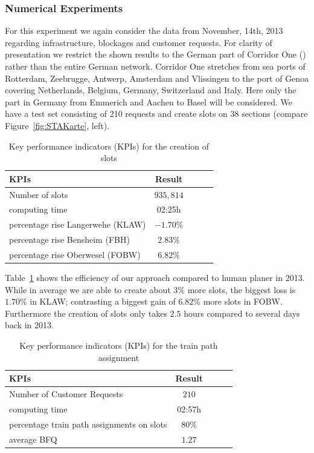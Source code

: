 \subsubsection{Numerical Experiments}
For this experiment we again consider the data from November, 14th, 2013 regarding infrastructure, blockages and customer requests. For clarity of presentation we restrict the shown results to the German part of Corridor One (\cite{Kor1}) rather than the entire German network. Corridor One stretches from sea ports of Rotterdam, Zeebrugge, Antwerp, Amsterdam and Vlissingen to the port of Genoa covering Netherlands, Belgium, Germany, Switzerland and Italy. Here only the part in Germany from Emmerich and Aachen to Basel will be considered. We have a test set consisting of 210 requests and create slots on 38 sections (compare Figure~\ref{fig:STAKarte}, left).
%
\begin{table}[h]
	\centering
	\caption{Key performance indicators (KPIs) for the creation of slots}
	\label{tab:result_Netzfpl}
	\begin{tabular}{lcccc} \hline
		\textbf{KPIs}   					& \textbf{Result}  \\ \hline
		Number of slots             		& $935,814$                      \\
		computing time       				& 02:25h                     \\
		percentage rise Langerwehe (KLAW)   & $-1.70\%$                       \\
		percentage rise Bensheim (FBH) 		& $2.83\%$                       \\
		percentage rise Oberwesel (FOBW) 	& $6.82\%$                     \\ \hline
	\end{tabular}
\end{table}
\par

Table~\ref{tab:result_Netzfpl} shows the efficiency of our approach compared to human planer in 2013. While in average we are able to create about $3\%$ more slots, the biggest loss is $1.70\%$ in KLAW; contrasting a biggest gain of $6.82\%$ more slots in FOBW. Furthermore the creation of slots only takes $2.5$ hours compared to several days back in 2013.
%
\begin{table}[h]
	\centering
	\caption{Key performance indicators (KPIs) for the train path assignment}
	\label{tab:result_Netzfpl_Bel}
	\begin{tabular}{lcccc} \hline
		\textbf{KPIs}   							& \textbf{Result}  \\ \hline
		Number of Customer Requests     			& $210$                      \\
		computing time       						& 02:57h                     \\
		percentage train path assignments on slots  & $80\%$                       \\
		average BFQ 								& $1.27$                             \\ \hline
	\end{tabular}
\end{table}
\par


